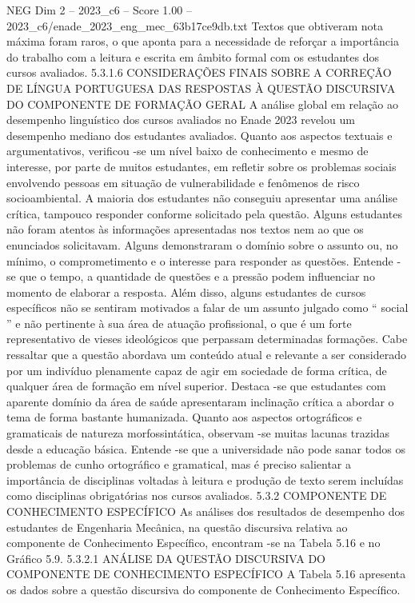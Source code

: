 \begin{textsample}{NEG Dim 2 – 2023\_c6 – Score 1.00 – 2023\_c6/enade\_2023\_eng\_mec\_63b17ce9db.txt}
Textos que obtiveram nota máxima foram raros, o que aponta para a necessidade de reforçar a importância do trabalho com a leitura e escrita em âmbito formal com os estudantes dos cursos avaliados. 5.3.1.6 CONSIDERAÇÕES FINAIS SOBRE A CORREÇÃO DE LÍNGUA PORTUGUESA DAS RESPOSTAS À QUESTÃO DISCURSIVA DO COMPONENTE DE FORMAÇÃO GERAL A análise global em relação ao desempenho linguístico dos cursos avaliados no Enade 2023 revelou um desempenho mediano dos estudantes avaliados.
Quanto aos aspectos textuais e argumentativos, verificou -se um nível baixo de conhecimento e mesmo de interesse, por parte de muitos estudantes, em refletir sobre os problemas sociais envolvendo pessoas em situação de vulnerabilidade e fenômenos de risco socioambiental.
A maioria dos estudantes não conseguiu apresentar uma análise crítica, tampouco responder conforme solicitado pela questão.
Alguns estudantes não foram atentos às informações apresentadas nos textos nem ao que os enunciados solicitavam.
Alguns demonstraram o domínio sobre o assunto ou, no mínimo, o comprometimento e o interesse para responder as questões.
Entende -se que o tempo, a quantidade de questões e a pressão podem influenciar no momento de elaborar a resposta.
Além disso, alguns estudantes de cursos específicos não se sentiram motivados a falar de um assunto julgado como “ social ” e não pertinente à sua área de atuação profissional, o que é um forte representativo de vieses ideológicos que perpassam determinadas formações.
Cabe ressaltar que a questão abordava um conteúdo atual e relevante a ser considerado por um indivíduo plenamente capaz de agir em sociedade de forma crítica, de qualquer área de formação em nível superior.
Destaca -se que estudantes com aparente domínio da área de saúde apresentaram inclinação crítica a abordar o tema de forma bastante humanizada.
Quanto aos aspectos ortográficos e gramaticais de natureza morfossintática, observam -se muitas lacunas trazidas desde a educação básica.
Entende -se que a universidade não pode sanar todos os problemas de cunho ortográfico e gramatical, mas é preciso salientar a importância de disciplinas voltadas à leitura e produção de texto serem incluídas como disciplinas obrigatórias nos cursos avaliados. 5.3.2 COMPONENTE DE CONHECIMENTO ESPECÍFICO As análises dos resultados de desempenho dos estudantes de Engenharia Mecânica, na questão discursiva relativa ao componente de Conhecimento Específico, encontram -se na Tabela 5.16 e no Gráfico 5.9. 5.3.2.1 ANÁLISE DA QUESTÃO DISCURSIVA DO COMPONENTE DE CONHECIMENTO ESPECÍFICO A Tabela 5.16 apresenta os dados sobre a questão discursiva do componente de Conhecimento Específico.

\end{textsample}
